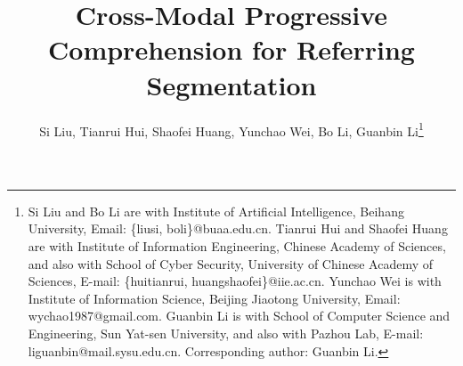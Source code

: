 \documentclass[10pt,journal,cspaper,compsoc]{IEEEtran}
\begin{document}
\title{Cross-Modal Progressive Comprehension for Referring Segmentation}

\author{Si Liu, Tianrui Hui, Shaofei Huang, Yunchao Wei, Bo Li, Guanbin Li\thanks{
Si Liu and Bo Li are with Institute of Artificial Intelligence, Beihang University, Email: \{liusi, boli\}@buaa.edu.cn.
Tianrui Hui and Shaofei Huang are with Institute of Information Engineering, Chinese Academy of Sciences, and also with School of Cyber Security, University of Chinese Academy of Sciences, E-mail: \{huitianrui, huangshaofei\}@iie.ac.cn.
Yunchao Wei is with Institute of Information Science, Beijing Jiaotong University, Email: wychao1987@gmail.com.
Guanbin Li is with School of Computer Science and Engineering, Sun Yat-sen University, and also with Pazhou Lab, E-mail: liguanbin@mail.sysu.edu.cn.
Corresponding author: Guanbin Li.}}


\end{document}
